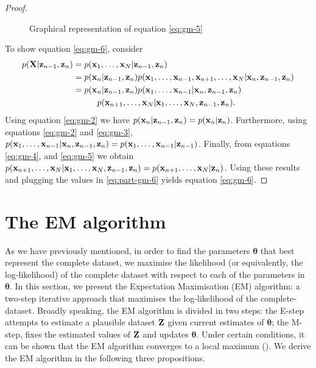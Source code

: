 \documentclass[12pt, oneside]{book}
\numberwithin{equation}{section}
\newcommand{\x}{{\bf x}}
\newcommand{\X}{{\bf X}}
\newcommand{\z}{{\bf z}}
\newcommand{\Z}{{\bf Z}}
\begin{document}
{\begin{proof}
	\begin{figure}[h!]
		\centering
		\resizebox{\columnwidth}{!}{}
		\caption{Graphical representation of equation \eqref{eq:gm-5}}
		\label{fig:gm-5}
	\end{figure}
	
	To show equation \eqref{eq:gm-6}, consider
	\begin{align}
		p(\X \vert \z_{n-1}, \z_n) &= p(\x_1, \ldots, \x_N \vert \z_{n-1},\z_n)\\
		 &= p(\x_n \vert \z_{n-1}, \z_n) p(\x_1, \ldots, \x_{n-1}, \x_{n+1}, \ldots, \x_N \vert \x_n, \z_{n-1}, \z_n)\\
		&= p(\x_n \vert \z_{n-1}, \z_n) p(\x_1, \ldots, \x_{n-1} \vert \x_n, \z_{n-1}, \z_n) \nonumber\\
			&\hspace{1cm} p(\x_{n+1}, \ldots, \x_N \vert \x_1, \ldots, \x_N, \z_{n-1}, \z_n). \label{eq:part-gm-6}
	\end{align}
	Using equation \eqref{eq:gm-2} we have $p(\x_n \vert \z_{n-1}, \z_n) = p(\x_n \vert \z_n)$. Furthermore, using equations \eqref{eq:gm-2} and \eqref{eq:gm-3}, $p(\x_1, \ldots, \x_{n-1} \vert \x_n, \z_{n-1}, \z_n) = p(\x_1, \ldots, \x_{n-1} \vert \z_{n-1})$. Finally, from equations \eqref{eq:gm-4}, and \eqref{eq:gm-5} we obtain  $p(\x_{n+1}, \ldots, \x_N \vert \x_1, \ldots, \x_N, \z_{n-1}, \z_n) = p(\x_{n+1}, \ldots, \x_N \vert  \z_{n})$. Using these results and plugging the values in \eqref{eq:part-gm-6} yields equation \eqref{eq:gm-6}.
\end{proof}


\section{The EM algorithm}

As we have previously mentioned, in order to find the parameters $\boldsymbol{\theta}$ that best represent the complete dataset, we maximise the likelihood (or equivalently, the log-likelihood) of the complete dataset with respect to each of the parameters in $\boldsymbol{\theta}$. In this section, we present the Expectation Maximisation (EM) algorithm: a two-step iterative approach that maximises the log-likelihood of the complete-dataset. Broadly speaking, the EM algorithm is divided in two steps: the E-step attempts to estimate a plausible dataset $\Z$ given current estimates of $\boldsymbol\theta$; the M-step, fixes the estimated values of $\Z$ and updates $\boldsymbol{\theta}$. Under certain conditions, it can be shown that the EM algorithm converges to a local maximum (\cite{pml1Book}). We derive the EM algorithm in the following three propositions.

}
\end{document}
